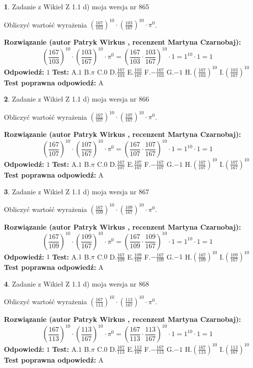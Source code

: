 \documentclass[12pt, a4paper]{article}
\theoremstyle{definition} %
\newtheorem{zad}{}
\newcommand{\zadStart}[1]{\begin{zad}#1\newline}
\newcommand{\zadStop}{\end{zad}}
\newcommand{\rozwStart}[2]{\noindent \textbf{Rozwiązanie (autor #1 , recenzent #2): }\newline}
\newcommand{\rozwStop}{\newline}
\newcommand{\odpStart}{\noindent \textbf{Odpowiedź:}\newline}
\newcommand{\odpStop}{\newline}
\newcommand{\testStart}{\noindent \textbf{Test:}\newline}
\newcommand{\testStop}{\newline}
\newcommand{\kluczStart}{\noindent \textbf{Test poprawna odpowiedź:}\newline}
\newcommand{\kluczStop}{\newline}
\begin{document}
\zadStart{Zadanie z Wikieł Z 1.1 d) moja wersja nr 865}

Obliczyć wartość wyrażenia $(\frac{167}{103})^{10} \cdot (\frac{103}{167})^{10} \cdot \pi^{0}$.
\zadStop
\rozwStart{Patryk Wirkus}{Martyna Czarnobaj}
$$(\frac{167}{103})^{10} \cdot (\frac{103}{167})^{10} \cdot \pi^{0} = (\frac{167}{103} \cdot \frac{103}{167})^{10} \cdot 1 = 1^{10} \cdot 1 = 1$$
\rozwStop
\odpStart
$1$
\odpStop
\testStart
A.$1$ B.$\pi$ C.$0$ D.$\frac{167}{103}$ E.$\frac{103}{167}$
F.$-\frac{167}{103}$ G.$-1$
H.$(\frac{167}{103})^{10}$
I.$(\frac{103}{167})^{10}$
\testStop
\kluczStart
A
\kluczStop



\zadStart{Zadanie z Wikieł Z 1.1 d) moja wersja nr 866}

Obliczyć wartość wyrażenia $(\frac{167}{107})^{10} \cdot (\frac{107}{167})^{10} \cdot \pi^{0}$.
\zadStop
\rozwStart{Patryk Wirkus}{Martyna Czarnobaj}
$$(\frac{167}{107})^{10} \cdot (\frac{107}{167})^{10} \cdot \pi^{0} = (\frac{167}{107} \cdot \frac{107}{167})^{10} \cdot 1 = 1^{10} \cdot 1 = 1$$
\rozwStop
\odpStart
$1$
\odpStop
\testStart
A.$1$ B.$\pi$ C.$0$ D.$\frac{167}{107}$ E.$\frac{107}{167}$
F.$-\frac{167}{107}$ G.$-1$
H.$(\frac{167}{107})^{10}$
I.$(\frac{107}{167})^{10}$
\testStop
\kluczStart
A
\kluczStop



\zadStart{Zadanie z Wikieł Z 1.1 d) moja wersja nr 867}

Obliczyć wartość wyrażenia $(\frac{167}{109})^{10} \cdot (\frac{109}{167})^{10} \cdot \pi^{0}$.
\zadStop
\rozwStart{Patryk Wirkus}{Martyna Czarnobaj}
$$(\frac{167}{109})^{10} \cdot (\frac{109}{167})^{10} \cdot \pi^{0} = (\frac{167}{109} \cdot \frac{109}{167})^{10} \cdot 1 = 1^{10} \cdot 1 = 1$$
\rozwStop
\odpStart
$1$
\odpStop
\testStart
A.$1$ B.$\pi$ C.$0$ D.$\frac{167}{109}$ E.$\frac{109}{167}$
F.$-\frac{167}{109}$ G.$-1$
H.$(\frac{167}{109})^{10}$
I.$(\frac{109}{167})^{10}$
\testStop
\kluczStart
A
\kluczStop



\zadStart{Zadanie z Wikieł Z 1.1 d) moja wersja nr 868}

Obliczyć wartość wyrażenia $(\frac{167}{113})^{10} \cdot (\frac{113}{167})^{10} \cdot \pi^{0}$.
\zadStop
\rozwStart{Patryk Wirkus}{Martyna Czarnobaj}
$$(\frac{167}{113})^{10} \cdot (\frac{113}{167})^{10} \cdot \pi^{0} = (\frac{167}{113} \cdot \frac{113}{167})^{10} \cdot 1 = 1^{10} \cdot 1 = 1$$
\rozwStop
\odpStart
$1$
\odpStop
\testStart
A.$1$ B.$\pi$ C.$0$ D.$\frac{167}{113}$ E.$\frac{113}{167}$
F.$-\frac{167}{113}$ G.$-1$
H.$(\frac{167}{113})^{10}$
I.$(\frac{113}{167})^{10}$
\testStop
\kluczStart
A
\kluczStop
\end{document}
